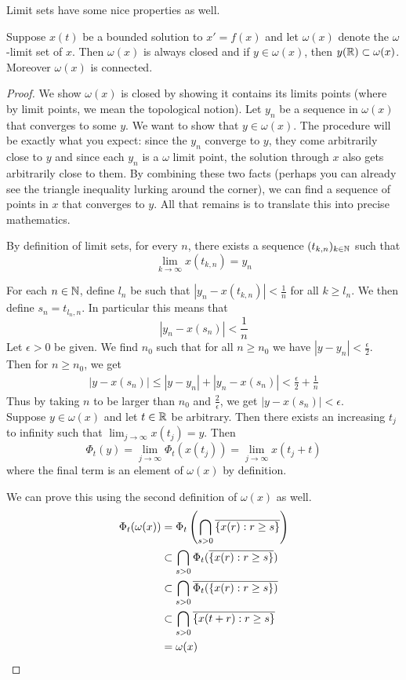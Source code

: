 Limit sets have some nice properties as well. 
\begin{proposition}\label{prop:omega-properties}
Suppose $x(t)$ be a bounded solution to $x' = f(x)$ and let $\omega(x)$ denote the $\omega$-limit set of $x$. Then $\omega(x)$ is always closed and if $y \in \omega(x)$, then $y(\mathbb{R}) \subset \omega(x)$. Moreover $\omega(x)$ is connected.
\end{proposition}
\begin{proof}
We show $\omega(x)$ is closed by showing it contains its limits points (where by limit points, we mean the topological notion). Let $y_n$ be a sequence in $\omega(x)$ that converges to some $y$. We want to show that $y \in \omega(x)$. The procedure will be exactly what you expect: since the $y_n$ converge to $y$, they come arbitrarily close to $y$ and since each $y_n$ is a $\omega$ limit point, the solution through $x$ also gets arbitrarily close to them. By combining these two facts (perhaps you can already see the triangle inequality lurking around the corner), we can find a sequence of points in $x$ that converges to $y$. All that remains is to translate this into precise mathematics.

By definition of limit sets, for every $n$, there exists a sequence $(t_{k, n})_{k \in \mathbb{N}}$ such that
$$ \lim_{k \to \infty} x(t_{k, n}) = y_n $$

For each $n \in \mathbb{N}$, define $l_n$ be such that $\left|y_n - x(t_{k, n})\right| < \frac{1}{n}$ for all $k \geq l_n$. We then define $s_n = t_{l_n, n}$. In particular this means that
$$ \left|y_n - x(s_n)\right| < \frac{1}{n} $$
Let $\epsilon > 0$ be given. We find $n_0$ such that for all $n \geq n_0$ we have $\left| y - y_n \right| < \frac{\epsilon}{2}$. Then for $n \geq n_0$, we get
\begin{align*}
    \left| y - x(s_n) \right| \leq \left| y - y_n \right| + \left| y_n - x(s_n) \right| < \frac{\epsilon}{2} + \frac{1}{n}
\end{align*}
Thus by taking $n$ to be larger than $n_0$ and $\frac{2}{\epsilon}$, we get $\left| y - x(s_n) \right| < \epsilon$.\\

Suppose $y \in \omega(x)$ and let $t \in \mathbb{R}$ be arbitrary. Then there exists an increasing $t_j$ to infinity such that $\lim_{j \to \infty} x(t_j) = y$. Then
$$ \Phi_t(y) = \lim_{j \to \infty} \Phi_t(x(t_j)) = \lim_{j \to \infty} x(t_j + t) $$
where the final term is an element of $\omega(x)$ by definition.

We can prove this using the second definition of $\omega(x)$ as well.
\begin{align*}
    \Phi_t(\omega(x)) &= \Phi_t \left( \bigcap_{s > 0} \overline{\{x(r): r \geq s\}} \right)\\
    &\subset \bigcap_{s > 0} \Phi_t (\overline{\{x(r) : r \geq s\}})\\
    &\subset \bigcap_{s > 0} \overline{ \Phi_t(\{x(r): r \geq s\}) }\\
    &\subset \bigcap_{s > 0} \overline{\{x(t + r): r \geq s\}}\\
    &= \omega(x)
\end{align*}


\end{proof}
